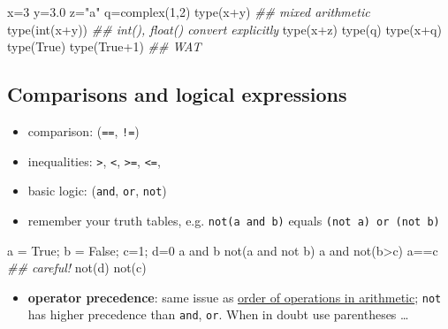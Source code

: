 \documentclass[]{tufte-handout}
\newenvironment{Shaded}{}{}
\newcommand{\DataTypeTok}[1]{\textcolor[rgb]{0.56,0.13,0.00}{{#1}}}
\newcommand{\DecValTok}[1]{\textcolor[rgb]{0.25,0.63,0.44}{{#1}}}
\newcommand{\FloatTok}[1]{\textcolor[rgb]{0.25,0.63,0.44}{{#1}}}
\newcommand{\StringTok}[1]{\textcolor[rgb]{0.25,0.44,0.63}{{#1}}}
\newcommand{\CommentTok}[1]{\textcolor[rgb]{0.38,0.63,0.69}{\textit{{#1}}}}
\newcommand{\OtherTok}[1]{\textcolor[rgb]{0.00,0.44,0.13}{{#1}}}
\newcommand{\NormalTok}[1]{{#1}}
\begin{document}
\begin{Shaded}
\begin{Highlighting}[]
\NormalTok{x=}\DecValTok{3}
\NormalTok{y=}\FloatTok{3.0}
\NormalTok{z=}\StringTok{"a"}
\NormalTok{q=}\DataTypeTok{complex}\NormalTok{(}\DecValTok{1}\NormalTok{,}\DecValTok{2}\NormalTok{)}
\DataTypeTok{type}\NormalTok{(x+y)  }\CommentTok{## mixed arithmetic}
\DataTypeTok{type}\NormalTok{(}\DataTypeTok{int}\NormalTok{(x+y))  }\CommentTok{## int(), float() convert explicitly}
\DataTypeTok{type}\NormalTok{(x+z)}
\DataTypeTok{type}\NormalTok{(q)}
\DataTypeTok{type}\NormalTok{(x+q)}
\DataTypeTok{type}\NormalTok{(}\OtherTok{True}\NormalTok{)}
\DataTypeTok{type}\NormalTok{(}\OtherTok{True}\DecValTok{+1}\NormalTok{) }\CommentTok{## WAT}
\end{Highlighting}
\end{Shaded}

\subsection{Comparisons and logical
expressions}\label{comparisons-and-logical-expressions}

\begin{itemize}
\itemsep1pt\parskip0pt
\item
  comparison: (\texttt{==}, \texttt{!=})
\item
  inequalities: \texttt{\textgreater{}}, \texttt{\textless{}},
  \texttt{\textgreater{}=}, \texttt{\textless{}=},
\item
  basic logic: (\texttt{and}, \texttt{or}, \texttt{not})
\item
  remember your truth tables, e.g. \texttt{not(a and b)} equals
  \texttt{(not a) or (not b)}
\end{itemize}

\begin{Shaded}
\begin{Highlighting}[]
\NormalTok{a = }\OtherTok{True}\NormalTok{; b = }\OtherTok{False}\NormalTok{; c=}\DecValTok{1}\NormalTok{; d=}\DecValTok{0}
\NormalTok{a and b}
\NormalTok{not(a and not b)}
\NormalTok{a and not(b>c)}
\NormalTok{a==c  }\CommentTok{## careful!}
\NormalTok{not(d)}
\NormalTok{not(c)}
\end{Highlighting}
\end{Shaded}

\begin{itemize}
\itemsep1pt\parskip0pt
\item
  \textbf{operator precedence}: same issue as
  \href{http://xkcd.com/992/}{order of operations in arithmetic};
  \texttt{not} has higher precedence than \texttt{and}, \texttt{or}.
  When in doubt use parentheses \ldots{}
\end{itemize}
\end{document}
